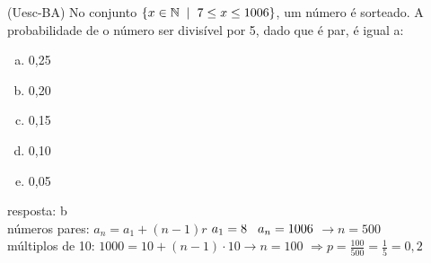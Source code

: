 \begin{ex}
(Uesc-BA) No conjunto $\{x\in\mathbb{N}\hspace{.2cm}|\hspace{.2cm} 7\leq x \leq 1006\} $,  um número é sorteado. A probabilidade de o número ser divisível por 5, dado que é par, é igual a:
   \begin{enumerate}[(a)]
   \item 0,25
   \item 0,20
   \item 0,15
   \item 0,10
   \item 0,05
   \end{enumerate}
     \begin{sol}
      resposta: b \\
      números pares:
      $a_n=a_1+(n-1)r$ \hspace{0,3cm } $a_1=8 \hspace{0,3cm } a_n=1006$  \hspace{0,3cm } $\rightarrow n=500$ \\
      múltiplos de 10: 
      $1000=10+(n-1)\cdot10 \rightarrow n=100$
      $\Longrightarrow p=\frac{100}{500}=\frac{1}{5}=0,2$
     \end{sol}
\end{ex}
